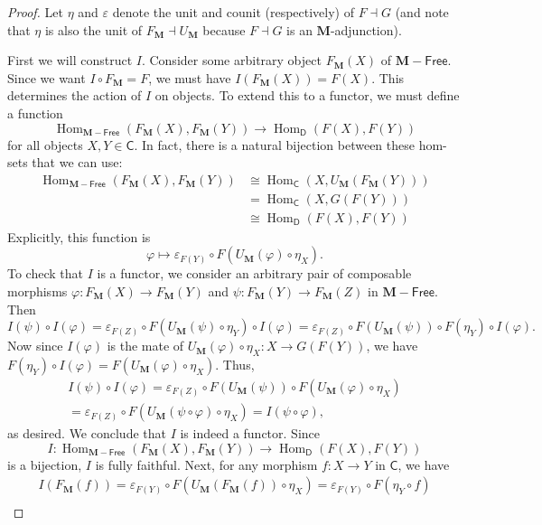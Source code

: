 \documentclass{article}
\theoremstyle{definition}
\newcommand{\C}{\mathsf{C}}
\newcommand{\D}{\mathsf{D}}
\newcommand{\M}{\mathbf{M}}
\newcommand{\Free}{\mathsf{Free}}
\DeclareMathOperator{\Hom}{Hom}
\begin{document}
\begin{proof}
    Let $\eta$ and $\varepsilon$ denote the unit and counit (respectively) of $F \dashv G$ (and note that $\eta$ is also the unit of $F_{\M} \dashv U_{\M}$ because $F \dashv G$ is an $\M$-adjunction).
    
    First we will construct $I$. Consider some arbitrary object $F_{\M}(X)$ of $\M{-}\Free$. Since we want $I \circ F_{\M} = F$, we must have $I(F_{\M}(X)) = F(X)$. This determines the action of $I$ on objects. To extend this to a functor, we must define a function
    \[\Hom_{\M{-}\Free}(F_{\M}(X),F_{\M}(Y)) \to \Hom_{\D}(F(X),F(Y))\]
    for all objects $X,Y \in \C$. In fact, there is a natural bijection between these hom-sets that we can use:
    \begin{align*}
        \Hom_{\M{-}\Free}(F_{\M}(X),F_{\M}(Y)) &\cong \Hom_{\C}(X,U_{\M}(F_{\M}(Y))) \\
        &= \Hom_{\C}(X,G(F(Y))) \\
        &\cong \Hom_{\D}(F(X),F(Y))
    \end{align*}
    Explicitly, this function is
    \[\varphi \mapsto \varepsilon_{F(Y)} \circ F(U_{\M}(\varphi) \circ \eta_X).\]
    To check that $I$ is a functor, we consider an arbitrary pair of composable morphisms $\varphi : F_{\M}(X) \to F_{\M}(Y)$ and $\psi : F_{\M}(Y) \to F_{\M}(Z)$ in $\M{-}\Free$. Then
    \[I(\psi) \circ I(\varphi) = \varepsilon_{F(Z)} \circ F(U_{\M}(\psi) \circ \eta_Y) \circ I(\varphi) = \varepsilon_{F(Z)} \circ F(U_{\M}(\psi)) \circ F(\eta_Y) \circ I(\varphi).\]
    Now since $I(\varphi)$ is the mate of $U_{\M}(\varphi) \circ \eta_X : X \to G(F(Y))$, we have $F(\eta_Y) \circ I(\varphi) = F(U_{\M}(\varphi) \circ \eta_X)$. Thus,
    \begin{multline*}
        I(\psi) \circ I(\varphi)
        = \varepsilon_{F(Z)} \circ F(U_{\M}(\psi)) \circ F(U_{\M}(\varphi) \circ \eta_X)\\
        = \varepsilon_{F(Z)} \circ F(U_{\M}(\psi \circ \varphi) \circ \eta_X)
        = I(\psi \circ \varphi),
    \end{multline*}
    as desired. We conclude that $I$ is indeed a functor. Since
    \[I : \Hom_{\M{-}\Free}(F_{\M}(X),F_{\M}(Y)) \to \Hom_{\D}(F(X),F(Y))\]
    is a bijection, $I$ is fully faithful. Next, for any morphism $f : X \to Y$ in $\C$, we have 
    \begin{multline*}
        I(F_{\M}(f))
        = \varepsilon_{F(Y)} \circ F(U_{\M}(F_{\M}(f)) \circ \eta_X)
        = \varepsilon_{F(Y)} \circ F(\eta_Y \circ f)\\

\end{multline*}
\end{proof}
\end{document}
